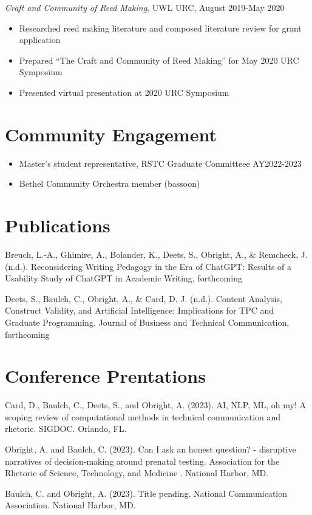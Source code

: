 \documentclass[
]{report}
\providecommand{\tightlist}{%
  \setlength{\itemsep}{0pt}\setlength{\parskip}{0pt}}\usepackage{longtable,booktabs,array}
\begin{document}
\emph{Craft and Community of Reed Making}, UWL URC, August 2019-May 2020

\begin{itemize}
\tightlist
\item
  Researched reed making literature and composed literature review for
  grant application
\item
  Prepared ``The Craft and Community of Reed Making'' for May 2020 URC
  Symposium
\item
  Presented virtual presentation at 2020 URC Symposium
\end{itemize}

\hypertarget{community-engagement}{%
\section{Community Engagement}\label{community-engagement}}

\begin{itemize}
\tightlist
\item
  Master's student representative, RSTC Graduate Committeee AY2022-2023
\item
  Bethel Community Orchestra member (bassoon)
\end{itemize}

\hypertarget{publications}{%
\section{Publications}\label{publications}}

Breuch, L.-A., Ghimire, A., Bolander, K., Deets, S., Obright, A., \&
Remcheck, J. (n.d.). Reconsidering Writing Pedagogy in the Era of
ChatGPT: Results of a Usability Study of ChatGPT in Academic Writing,
forthcoming

Deets, S., Baulch, C., Obright, A., \& Card, D. J. (n.d.). Content
Analysis, Construct Validity, and Artificial Intelligence: Implications
for TPC and Graduate Programming. Journal of Business and Technical
Communication, forthcoming

\hypertarget{conference-prentations}{%
\section{Conference Prentations}\label{conference-prentations}}

Card, D., Baulch, C., Deets, S., and Obright, A. (2023). AI, NLP, ML, oh
my! A scoping review of computational methods in technical communication
and rhetoric. SIGDOC. Orlando, FL.

Obright, A. and Baulch, C. (2023). Can I ask an honest question? -
disruptive narratives of decision-making around prenatal testing.
Association for the Rhetoric of Science, Technology, and Medicine .
National Harbor, MD.

Baulch, C. and Obright, A. (2023). Title pending. National Communication
Association. National Harbor, MD.
\end{document}
